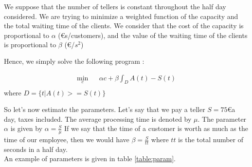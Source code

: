 \documentclass[12pt,a4paper,notitlepage]{report}
\begin{document}
We suppose that the number of tellers is constant throughout the half day considered.
We are trying to minimize a weighted function of the capacity and the total waiting time of the clients.
We consider that the cost of the capacity is proportional to $ \alpha$ (\euro s/customers), and the value of the waiting time of the clients is proportional to $\beta$ (\euro/$s^2$)

Hence, we simply solve the following program :

\begin{eqnarray*}
\min_c & & \alpha c + \beta \int_D A(t)-S(t)\\
\end{eqnarray*}
where $D = \{t | A(t)>=S(t) \}$

So let's now estimate the parameters. Let's say that we pay a teller $S = 75$\euro a day, taxes included.
The average processing time is denoted by $\mu$. 
The parameter $\alpha$ is given by $\alpha = \frac{S}{\mu}$
If we say that the time of a customer is worth as much as the time of our employee, then we would have $\beta = \frac{S}{tt}$ where $tt$ is the total number of seconds in a half day.\\
An example of parameters is given in table \ref{table:param}.
\end{document}
